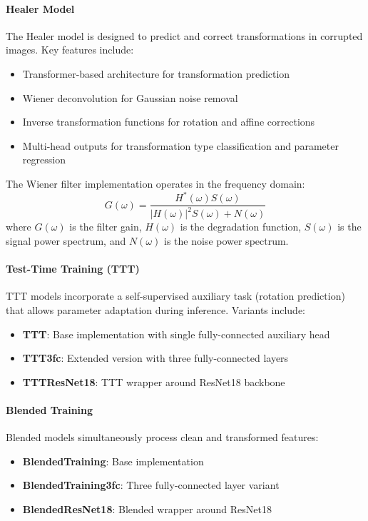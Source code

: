 \documentclass[11pt,a4paper]{article}
\begin{document}
\paragraph{Healer Model}
The Healer model is designed to predict and correct transformations in corrupted images. Key features include:
\begin{itemize}
    \item Transformer-based architecture for transformation prediction
    \item Wiener deconvolution for Gaussian noise removal
    \item Inverse transformation functions for rotation and affine corrections
    \item Multi-head outputs for transformation type classification and parameter regression
\end{itemize}

The Wiener filter implementation operates in the frequency domain:
\begin{equation}
G(\omega) = \frac{H^*(\omega)S(\omega)}{|H(\omega)|^2S(\omega) + N(\omega)}
\end{equation}
where $G(\omega)$ is the filter gain, $H(\omega)$ is the degradation function, $S(\omega)$ is the signal power spectrum, and $N(\omega)$ is the noise power spectrum.

\paragraph{Test-Time Training (TTT)}
TTT models incorporate a self-supervised auxiliary task (rotation prediction) that allows parameter adaptation during inference. Variants include:
\begin{itemize}
    \item \textbf{TTT}: Base implementation with single fully-connected auxiliary head
    \item \textbf{TTT3fc}: Extended version with three fully-connected layers
    \item \textbf{TTTResNet18}: TTT wrapper around ResNet18 backbone
\end{itemize}

\paragraph{Blended Training}
Blended models simultaneously process clean and transformed features:
\begin{itemize}
    \item \textbf{BlendedTraining}: Base implementation
    \item \textbf{BlendedTraining3fc}: Three fully-connected layer variant
    \item \textbf{BlendedResNet18}: Blended wrapper around ResNet18
\end{itemize}
\end{document}
